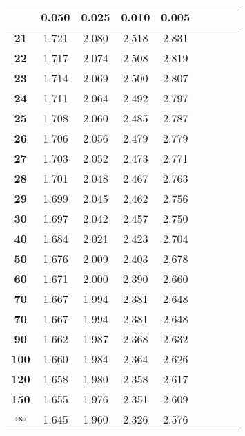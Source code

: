 \noindent\begin{tabular}{*{9}{|c}|}
    \hline
     & \textbf{0.050} & \textbf{0.025} & \textbf{0.010} & \textbf{0.005} \\
    \hline 
\textbf{21} & 1.721 &2.080 &2.518 &2.831 \\
\hline 
\textbf{22} & 1.717 &2.074 &2.508 &2.819 \\
\hline 
\textbf{23} & 1.714 &2.069 &2.500 &2.807 \\
\hline 
\textbf{24} & 1.711 &2.064 &2.492 &2.797 \\
\hline 
\textbf{25} & 1.708 &2.060 &2.485 &2.787 \\
\hline 
\textbf{26} & 1.706 &2.056 &2.479 &2.779 \\
\hline 
\textbf{27} & 1.703 &2.052 &2.473 &2.771 \\
\hline 
\textbf{28} & 1.701 &2.048 &2.467 &2.763 \\
\hline 
\textbf{29} & 1.699 &2.045 &2.462 &2.756 \\
\hline 
\textbf{30} & 1.697 &2.042 &2.457 &2.750 \\
\hline 
\textbf{40} & 1.684 &2.021 &2.423 &2.704 \\
\hline 
\textbf{50} & 1.676 &2.009 &2.403 &2.678 \\
\hline 
\textbf{60} & 1.671 &2.000 &2.390 &2.660 \\
\hline 
\textbf{70} & 1.667 &1.994 &2.381 &2.648 \\
\hline 
\textbf{70} & 1.667 &1.994 &2.381 &2.648 \\
\hline 
\textbf{90} & 1.662 &1.987 &2.368 &2.632 \\
\hline 
\textbf{100} & 1.660 &1.984 &2.364 &2.626 \\
\hline 
\textbf{120} & 1.658 &1.980 &2.358 &2.617 \\
\hline 
\textbf{150} & 1.655 &1.976 &2.351 &2.609 \\
\hline 
$\pmb{\infty}$& 1.645 &1.960 &2.326 &2.576 \\
\hline 
\end{tabular}